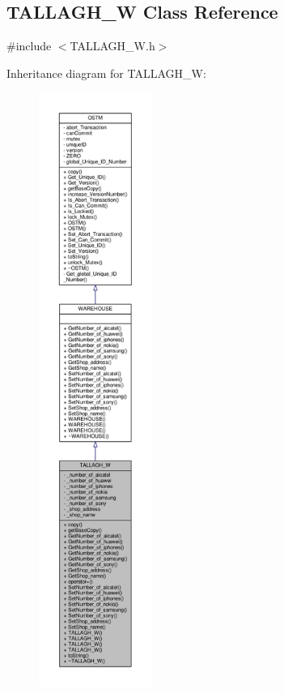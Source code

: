 \hypertarget{class_t_a_l_l_a_g_h___w}{}\subsection{T\+A\+L\+L\+A\+G\+H\+\_\+W Class Reference}
\label{class_t_a_l_l_a_g_h___w}


{\ttfamily \#include $<$T\+A\+L\+L\+A\+G\+H\+\_\+\+W.\+h$>$}



Inheritance diagram for T\+A\+L\+L\+A\+G\+H\+\_\+W\+:\nopagebreak
\begin{figure}[H]
\begin{center}
\leavevmode
\includegraphics[height=550pt]{class_t_a_l_l_a_g_h___w__inherit__graph}
\end{center}
\end{figure}


